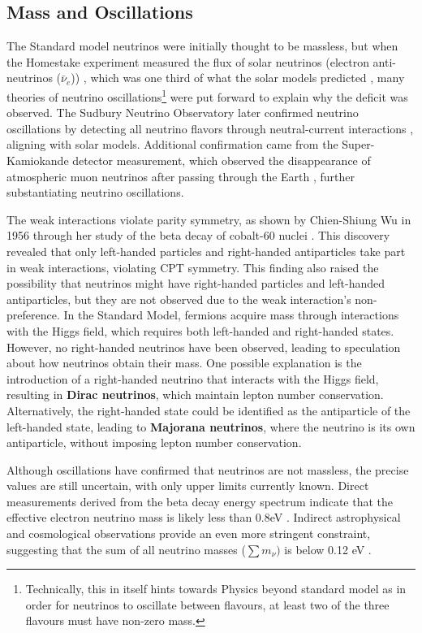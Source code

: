 \subsection{Mass and Oscillations}
\label{sec:nu_mass_osc}
The Standard model neutrinos were initially thought to be massless, but when the Homestake experiment measured the flux of solar neutrinos (electron anti-neutrinos ($\bar{\nu}_e$)) , which was one third of what the solar models predicted , many theories of neutrino oscillations\footnote{Technically, this in itself hints towards Physics beyond standard model as in order for neutrinos to oscillate between flavours, at least two of the three flavours must have non-zero mass.} were put forward to explain why the deficit was observed. The Sudbury Neutrino Observatory later confirmed neutrino oscillations by detecting all neutrino flavors through neutral-current interactions , aligning with solar models. Additional confirmation came from the Super-Kamiokande detector measurement, which observed the disappearance of atmospheric muon neutrinos after passing through the Earth , further substantiating neutrino oscillations. 

The weak interactions violate parity symmetry, as shown by Chien-Shiung Wu in 1956 through her study of the beta decay of cobalt-60 nuclei . This discovery revealed that only left-handed particles and right-handed antiparticles take part in weak interactions, violating CPT symmetry. This finding also raised the possibility that neutrinos might have right-handed particles and left-handed antiparticles, but they are not observed due to the weak interaction's non-preference. In the Standard Model, fermions acquire mass through interactions with the Higgs field, which requires both left-handed and right-handed states. However, no right-handed neutrinos have been observed, leading to speculation about how neutrinos obtain their mass. One possible explanation is the introduction of a right-handed neutrino that interacts with the Higgs field, resulting in \textbf{Dirac neutrinos}, which maintain lepton number conservation. Alternatively, the right-handed state could be identified as the antiparticle of the left-handed state, leading to \textbf{Majorana neutrinos}, where the neutrino is its own antiparticle, without imposing lepton number conservation.

Although oscillations have confirmed that neutrinos are not massless, the precise values are still uncertain, with only upper limits currently known. Direct measurements derived from the beta decay energy spectrum indicate that the effective electron neutrino mass is likely less than 0.8eV . Indirect astrophysical and cosmological observations provide an even more stringent constraint, suggesting that the sum of all neutrino masses ($\sum{{m}_{\nu}})$ is below 0.12 eV . 

